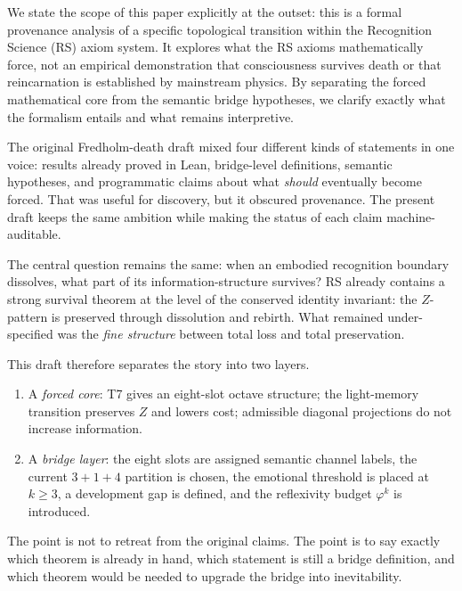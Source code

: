 \documentclass[11pt,a4paper]{article}
\theoremstyle{definition}
\newcommand{\phig}{\varphi}
\newcommand{\Zp}{Z}
\begin{document}
We state the scope of this paper explicitly at the outset: this is a formal provenance analysis of a specific topological transition within the Recognition Science (RS) axiom system. It explores what the RS axioms mathematically force, not an empirical demonstration that consciousness survives death or that reincarnation is established by mainstream physics. By separating the forced mathematical core from the semantic bridge hypotheses, we clarify exactly what the formalism entails and what remains interpretive.

The original Fredholm-death draft mixed four different kinds of statements
in one voice: results already proved in Lean, bridge-level definitions,
semantic hypotheses, and programmatic claims about what \emph{should}
eventually become forced.  That was useful for discovery, but it obscured
provenance.  The present draft keeps the same ambition while making the
status of each claim machine-auditable.

The central question remains the same: when an embodied recognition boundary
dissolves, what part of its information-structure survives?  RS already
contains a strong survival theorem at the level of the conserved identity
invariant: the $\Zp$-pattern is preserved through dissolution and rebirth.
What remained under-specified was the \emph{fine structure} between total
loss and total preservation.

This draft therefore separates the story into two layers.

\begin{enumerate}[label=(\roman*)]
\item A \emph{forced core}: T7 gives an eight-slot octave structure; the
  light-memory transition preserves $\Zp$ and lowers cost; admissible
  diagonal projections do not increase information.
\item A \emph{bridge layer}: the eight slots are assigned semantic channel
  labels, the current $3+1+4$ partition is chosen, the emotional threshold
  is placed at $k \ge 3$, a development gap is defined, and the reflexivity
  budget $\phig^k$ is introduced.
\end{enumerate}

The point is not to retreat from the original claims.  The point is to say
exactly which theorem is already in hand, which statement is still a bridge
definition, and which theorem would be needed to upgrade the bridge into
inevitability.

\end{document}
